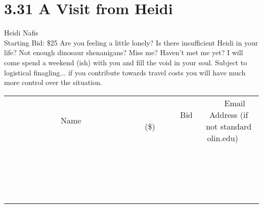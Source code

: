 \documentclass[11pt]{article}
\begin{document}
\section*{3.31 A Visit from Heidi}
Heidi Nafis
\\
Starting Bid: \$25
\newline
Are you feeling a little lonely? Is there insufficient Heidi in your life? Not enough dinosaur shenanigans? Miss me? Haven't met me yet? I will come spend a weekend (ish) with you and fill the void in your soul. Subject to logistical finagling... if you contribute towards travel costs you will have much more control over the situation.
\\[3ex]
\begin{tabular}{c c c}
~~~~~~~~~~~~~Name~~~~~~~~~~~~~ & ~~~~~~~~~Bid (\$)~~~~~~~~~  & ~~~Email Address (if not standard olin.edu)~~~\\
 & & \\
\hline
 & & \\
\hline
 & & \\
\hline
 & & \\
\hline
 & & \\
\hline
 & & \\
\hline
 & & \\
\hline
 & & \\
\hline
 & & \\
\hline
 & & \\
\hline
 & & \\
\hline
 & & \\
\hline
 & & \\
\hline
 & & \\
\hline
 & & \\
\hline
 & & \\
\hline
 & & \\
\hline
 & & \\
\hline
 & & \\
\hline
\end{tabular}
\newpage
\end{document}

